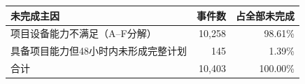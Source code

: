 \begin{tabular}{lrr}
\toprule
未完成主因 & 事件数 & 占全部未完成 \\
\midrule
项目设备能力不满足（A--F分解） & 10,258 & 98.61\% \\
具备项目能力但48小时内未形成完整计划 & 145 & 1.39\% \\
\midrule
合计 & 10,403 & 100.00\% \\
\bottomrule
\end{tabular}
